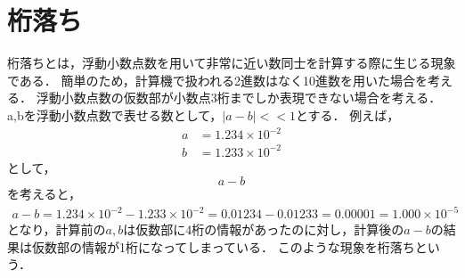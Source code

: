 \section{桁落ち}
桁落ちとは，浮動小数点数を用いて非常に近い数同士を計算する際に生じる現象である．
簡単のため，計算機で扱われる2進数はなく10進数を用いた場合を考える．
浮動小数点数の仮数部が小数点3桁までしか表現できない場合を考える．
a,bを浮動小数点数で表せる数として，$|a - b| << 1$とする．
例えば，
\begin{align}
    a &= 1.234 \times 10^{-2} \\
    b &= 1.233 \times 10^{-2}
\end{align}
として，
\begin{equation}
    a - b
\end{equation}
を考えると，
\begin{align}
    a - b = 1.234 \times 10^{-2} - 1.233 \times 10^{-2} = 0.01234 - 0.01233 = 0.00001 = 1.000 \times 10^{-5}
\end{align}
となり，計算前の$a,b$は仮数部に4桁の情報があったのに対し，計算後の$a-b$の結果は仮数部の情報が1桁になってしまっている．
このような現象を桁落ちという．